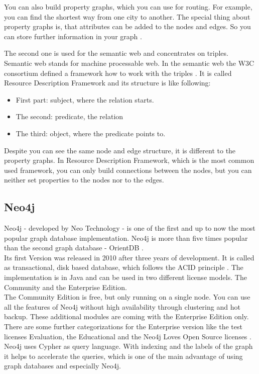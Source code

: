 You can also build property graphs, which you can use for routing. For example, you can find the shortest way from one city to another. The special thing about property graphs is, that attributes can be added to the nodes and edges. So you can store further information in your graph \cite[p. 3]{RodriguezNeubauer.2010}.

The second one is used for the semantic web and concentrates on triples. Semantic web stands for machine processable web. In the semantic web the W3C consortium defined a framework how to work with the triples \cite["Overview", para. 1]{W3C.2014}. It is called Resource Description Framework and its structure is like following:

\begin{itemize}
	\item First part: subject, where the relation starts.
	\item The second: predicate, the relation
	\item The third: object, where the predicate points to.
\end{itemize}  

Despite you can see the same node and edge structure, it is different to the property graphs. In Resource Description Framework, which is the most common used framework, you can only build connections between the nodes, but you can neither set properties to the nodes nor to the edges.

\subsection{Neo4j}

Neo4j - developed by Neo Technology - is one of the first and up to now the most popular graph database implementation. Neo4j is more than five times popular than the second graph database - OrientDB  \cite[para. 1]{SolidITGmbH.2017}.\\
Its first Version was released in 2010 after three years of development. It is called as transactional, disk based database, which follows the ACID principle \cite["Neo4j Internals", para. 4]{NeoTechnologyInc.2017b}. The implementation is in Java and can be used in two different license models. The Community and the Enterprise Edition.\\
The Community Edition is free, but only running on a single node. You can use all the features of Neo4j without high availability through clustering and hot backup. 
These additional modules are coming with the Enterprise Edition only. There are some further categorizations for the Enterprise version like the test licenses Evaluation, the Educational and the Neo4j Loves Open Source licenses \cite["About Neo4j Licenses", para. 1]{NeoTechnologyInc.2017a}.\\
Neo4j uses Cypher as query language. With indexing and the labels of the graph it helps to accelerate the queries, which is one of the main advantage of using graph databases and especially Neo4j.

